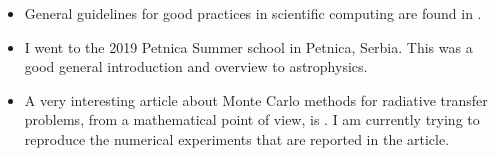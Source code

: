 \documentclass[../main/main.tex]{subfiles}
\begin{document}
\begin{itemize}
\item General guidelines for good practices in scientific computing are found in \cite{Wilson2014}.

\item I went to the 2019 Petnica Summer school in Petnica, Serbia. This was a good general introduction and overview to astrophysics.

\item A very interesting article about Monte Carlo methods for radiative transfer problems, from a mathematical point of view, is \cite{Dimarco2018}. I am currently trying to reproduce the numerical experiments that are reported in the article. 

\end{itemize}
\end{document}
